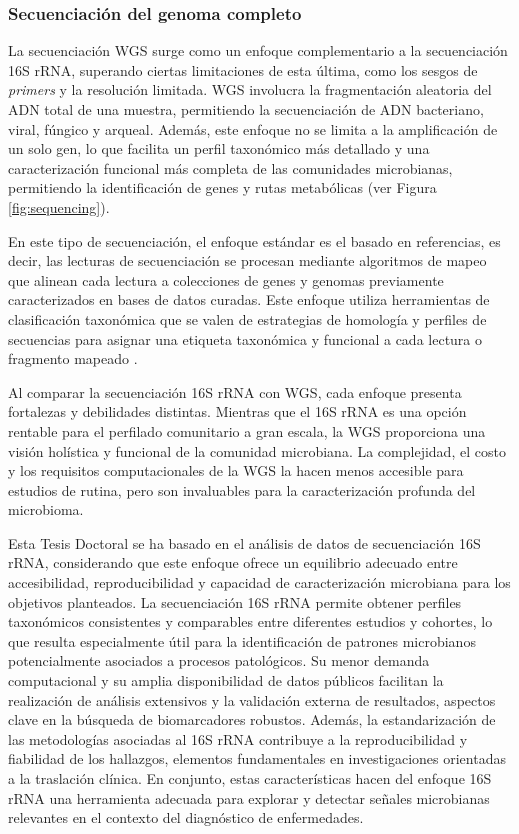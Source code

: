 \subsubsection{Secuenciación del genoma completo}

La secuenciación WGS surge como un enfoque complementario a la secuenciación 16S rRNA, superando ciertas limitaciones de esta última, como los sesgos de \textit{primers} y la resolución limitada. WGS involucra la fragmentación aleatoria del ADN total de una muestra, permitiendo la secuenciación de ADN bacteriano, viral, fúngico y arqueal. Además, este enfoque no se limita a la amplificación de un solo gen, lo que facilita un perfil taxonómico más detallado y una caracterización funcional más completa de las comunidades microbianas, permitiendo la identificación de genes y rutas metabólicas (ver Figura \ref{fig:sequencing}).

En este tipo de secuenciación, el enfoque estándar es el basado en referencias, es decir, las lecturas de secuenciación se procesan mediante algoritmos de mapeo que alinean cada lectura a colecciones de genes y genomas previamente caracterizados en bases de datos curadas. Este enfoque utiliza herramientas de clasificación taxonómica que se valen de estrategias de homología y perfiles de secuencias para asignar una etiqueta taxonómica y funcional a cada lectura o fragmento mapeado \cite{bharti2021current}.

Al comparar la secuenciación 16S rRNA con WGS, cada enfoque presenta fortalezas y debilidades distintas. Mientras que el 16S rRNA es una opción rentable para el perfilado comunitario a gran escala, la WGS proporciona una visión holística y funcional de la comunidad microbiana. La complejidad, el costo y los requisitos computacionales de la WGS la hacen menos accesible para estudios de rutina, pero son invaluables para la caracterización profunda del microbioma.


Esta Tesis Doctoral se ha basado en el análisis de datos de secuenciación 16S rRNA, considerando que este enfoque ofrece un equilibrio adecuado entre accesibilidad, reproducibilidad y capacidad de caracterización microbiana para los objetivos planteados. La secuenciación 16S rRNA permite obtener perfiles taxonómicos consistentes y comparables entre diferentes estudios y cohortes, lo que resulta especialmente útil para la identificación de patrones microbianos potencialmente asociados a procesos patológicos. Su menor demanda computacional y su amplia disponibilidad de datos públicos facilitan la realización de análisis extensivos y la validación externa de resultados, aspectos clave en la búsqueda de biomarcadores robustos. Además, la estandarización de las metodologías asociadas al 16S rRNA contribuye a la reproducibilidad y fiabilidad de los hallazgos, elementos fundamentales en investigaciones orientadas a la traslación clínica. En conjunto, estas características hacen del enfoque 16S rRNA una herramienta adecuada para explorar y detectar señales microbianas relevantes en el contexto del diagnóstico de enfermedades.


